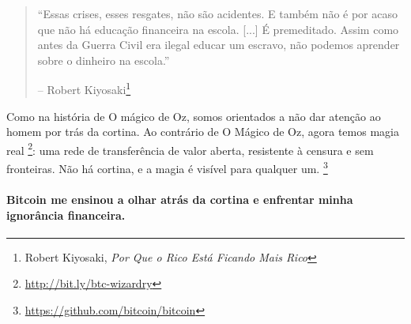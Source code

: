 \begin{quotation}\begin{samepage}
\enquote{Essas crises, esses resgates, não são acidentes. E também não é por acaso que não há educação financeira na escola. [...] É premeditado. Assim como antes da Guerra Civil era ilegal educar um escravo, não podemos aprender sobre o dinheiro na escola.}
\begin{flushright} -- Robert Kiyosaki\footnote{Robert Kiyosaki, \textit{Por Que o Rico Está Ficando Mais Rico}\cite{robert-kiyosaki}}
\end{flushright}\end{samepage}\end{quotation}

Como na história de O mágico de Oz, somos orientados a não dar atenção ao homem por trás da cortina. Ao contrário de O Mágico de Oz, agora temos magia real \footnote{\url{http://bit.ly/btc-wizardry}}: uma rede de transferência de valor aberta, resistente à censura e sem fronteiras. Não há cortina, e a magia é visível para qualquer um. \footnote{\url{https://github.com/bitcoin/bitcoin}}

\paragraph{Bitcoin me ensinou a olhar atrás da cortina e enfrentar minha ignorância financeira.}

%
%
%
%
